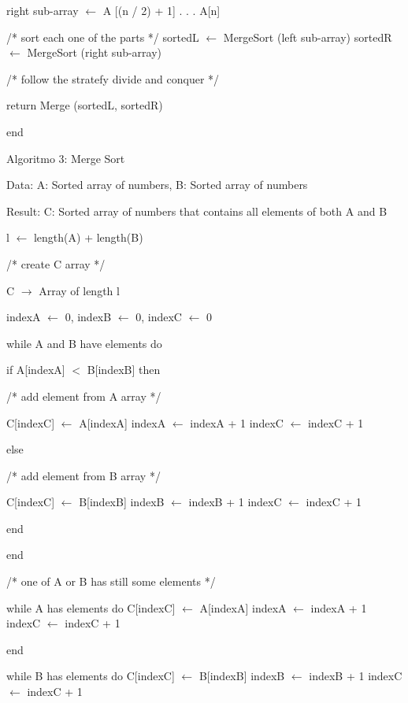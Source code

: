 ﻿\documentclass{article} %
\begin{document}
\noindent right sub-array $\mathrm{\leftarrow}$ A [(n / 2) + 1] . . . A[n]

\noindent /* sort each one of the parts */ sortedL $\mathrm{\leftarrow}$ MergeSort (left sub-array) sortedR $\mathrm{\leftarrow}$ MergeSort (right sub-array)

\noindent /* follow the stratefy divide and conquer */

\noindent return Merge (sortedL, sortedR)

\noindent end

\noindent Algoritmo 3: Merge Sort

\noindent 

\noindent Data:  A: Sorted array of numbers, B: Sorted array of numbers

\noindent Result:  C: Sorted array of numbers that contains all elements of both A and B

\noindent l $\mathrm{\leftarrow}$ length(A) + length(B)

\noindent /* create C array */

\noindent C $\mathrm{\to}$ Array of length l

\noindent indexA $\mathrm{\leftarrow}$ 0, indexB $\mathrm{\leftarrow}$ 0, indexC $\mathrm{\leftarrow}$ 0

\noindent while A and B have elements do

\noindent if A[indexA] $\mathrm{<}$ B[indexB] then

\noindent /* add element from A array */

\noindent C[indexC] $\mathrm{\leftarrow}$ A[indexA] indexA $\mathrm{\leftarrow}$ indexA + 1 indexC $\mathrm{\leftarrow}$ indexC + 1

\noindent else

\noindent /* add element from B array */

\noindent C[indexC] $\mathrm{\leftarrow}$ B[indexB] indexB $\mathrm{\leftarrow}$ indexB + 1 indexC $\mathrm{\leftarrow}$ indexC + 1

\noindent end

\noindent end

\noindent /* one of A or B has still some elements */

\noindent while A has elements do C[indexC] $\mathrm{\leftarrow}$ A[indexA] indexA $\mathrm{\leftarrow}$ indexA + 1 indexC $\mathrm{\leftarrow}$ indexC + 1

\noindent end

\noindent while B has elements do C[indexC] $\mathrm{\leftarrow}$ B[indexB] indexB $\mathrm{\leftarrow}$ indexB + 1 indexC $\mathrm{\leftarrow}$ indexC + 1
\end{document}
